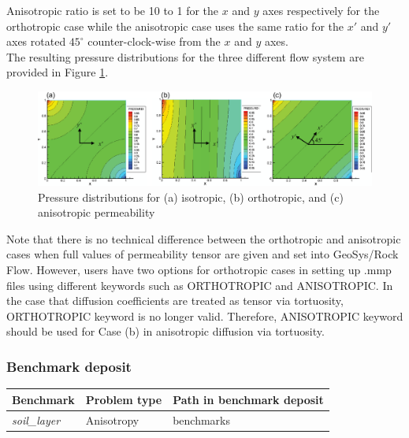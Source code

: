Anisotropic ratio is set to be 10 to 1 for the $x$ and $y$ axes respectively for the orthotropic case while the anisotropic case uses the same ratio for the $x'$ and $y'$ axes rotated $45^ \circ  $ counter-clock-wise from the $x$ and $y$ axes.\\
The resulting pressure distributions for the three different flow system are provided in Figure \ref{AnisotropicPermeability}.
\begin{figure}[H]
\centering
\includegraphics[scale=0.60]{Anisotropy/figures/anisotropicpermeability.eps}
\caption{Pressure distributions for (a) isotropic, (b) orthotropic, and (c) anisotropic permeability}
\label{AnisotropicPermeability}
\end{figure}

Note that there is no technical difference between the orthotropic and anisotropic cases when full values of permeability tensor are given and set into GeoSys/Rock \\Flow. However, users have two options for orthotropic cases in setting up .mmp files using different keywords such as ORTHOTROPIC and ANISOTROPIC.  In the case that diffusion coefficients are treated as tensor via tortuosity, ORTHOTROPIC keyword is no longer valid. Therefore, ANISOTROPIC keyword should be used for Case (b) in anisotropic diffusion via tortuosity.

\subsubsection*{Benchmark deposit}
\begin{tabular}{|l|l|l|}
  \hline
  Benchmark & Problem type & Path in benchmark deposit \\
  \hline
 \emph{soil\_layer}& Anisotropy & benchmarks\verb \Anisotropy\permeability \\
  \hline
\end{tabular}

